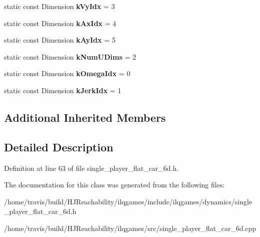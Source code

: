 \begin{DoxyCompactItemize}
\item 
static const Dimension {\bfseries k\+Vy\+Idx} = 3\hypertarget{classilqgames_1_1_single_player_flat_car6_d_aa20d5310f3056be34cedbb3372fd36a4}{}\label{classilqgames_1_1_single_player_flat_car6_d_aa20d5310f3056be34cedbb3372fd36a4}

\item 
static const Dimension {\bfseries k\+Ax\+Idx} = 4\hypertarget{classilqgames_1_1_single_player_flat_car6_d_a92b405276235bd2f1206a4740660c394}{}\label{classilqgames_1_1_single_player_flat_car6_d_a92b405276235bd2f1206a4740660c394}

\item 
static const Dimension {\bfseries k\+Ay\+Idx} = 5\hypertarget{classilqgames_1_1_single_player_flat_car6_d_a641b93b0a83a4794f8b44f7f387258c1}{}\label{classilqgames_1_1_single_player_flat_car6_d_a641b93b0a83a4794f8b44f7f387258c1}

\item 
static const Dimension {\bfseries k\+Num\+U\+Dims} = 2\hypertarget{classilqgames_1_1_single_player_flat_car6_d_ae8329151026fbee7ed9c59e4a4fd4507}{}\label{classilqgames_1_1_single_player_flat_car6_d_ae8329151026fbee7ed9c59e4a4fd4507}

\item 
static const Dimension {\bfseries k\+Omega\+Idx} = 0\hypertarget{classilqgames_1_1_single_player_flat_car6_d_a9775a4b9e7ee526146b5cfb6631268d8}{}\label{classilqgames_1_1_single_player_flat_car6_d_a9775a4b9e7ee526146b5cfb6631268d8}

\item 
static const Dimension {\bfseries k\+Jerk\+Idx} = 1\hypertarget{classilqgames_1_1_single_player_flat_car6_d_acd36e1fdc5fa7758ef19493cb6766b9c}{}\label{classilqgames_1_1_single_player_flat_car6_d_acd36e1fdc5fa7758ef19493cb6766b9c}

\end{DoxyCompactItemize}
\subsection*{Additional Inherited Members}


\subsection{Detailed Description}


Definition at line 63 of file single\+\_\+player\+\_\+flat\+\_\+car\+\_\+6d.\+h.



The documentation for this class was generated from the following files\+:\begin{DoxyCompactItemize}
\item 
/home/travis/build/\+H\+J\+Reachability/ilqgames/include/ilqgames/dynamics/single\+\_\+player\+\_\+flat\+\_\+car\+\_\+6d.\+h\item 
/home/travis/build/\+H\+J\+Reachability/ilqgames/src/single\+\_\+player\+\_\+flat\+\_\+car\+\_\+6d.\+cpp\end{DoxyCompactItemize}
